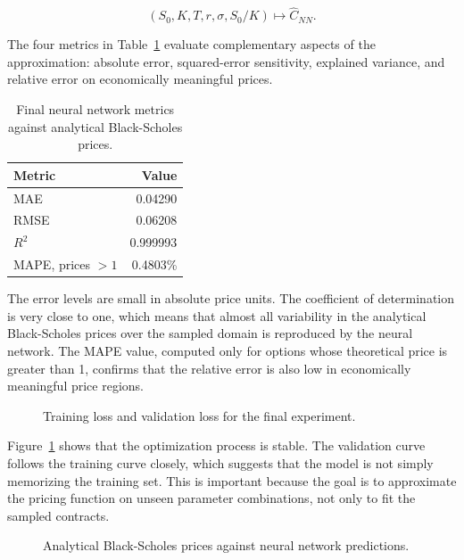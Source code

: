 \begin{equation}
    (S_0, K, T, r, \sigma, S_0/K)
    \longmapsto
    \hat{C}_{NN}.
\end{equation}

The four metrics in Table~\ref{tab:nn-final-metrics} evaluate complementary aspects of the approximation:
absolute error, squared-error sensitivity, explained variance, and relative error on economically meaningful prices.

\begin{table}[H]
    \centering
    \begin{tabular}{lr}
        \toprule
        Metric             & Value    \\
        \midrule
        MAE                & 0.04290  \\
        RMSE               & 0.06208  \\
        $R^2$              & 0.999993 \\
        MAPE, prices $> 1$ & 0.4803\% \\
        \bottomrule
    \end{tabular}
    \caption{Final neural network metrics against analytical Black-Scholes prices.}
    \label{tab:nn-final-metrics}
\end{table}

The error levels are small in absolute price units.
The coefficient of determination is very close to one, which means that almost all variability in the analytical Black-Scholes prices over the sampled domain is reproduced by the neural network.
The MAPE value, computed only for options whose theoretical price is greater than 1, confirms that the relative error is also low in economically meaningful price regions.

\begin{figure}[H]
    \centering
    \caption{Training loss and validation loss for the final experiment.}
    \label{fig:final-loss}
\end{figure}

Figure~\ref{fig:final-loss} shows that the optimization process is stable.
The validation curve follows the training curve closely, which suggests that the model is not simply memorizing the training set.
This is important because the goal is to approximate the pricing function on unseen parameter combinations, not only to fit the sampled contracts.

\begin{figure}[H]
    \centering
    \caption{Analytical Black-Scholes prices against neural network predictions.}
    \label{fig:final-true-vs-predicted}
\end{figure}


